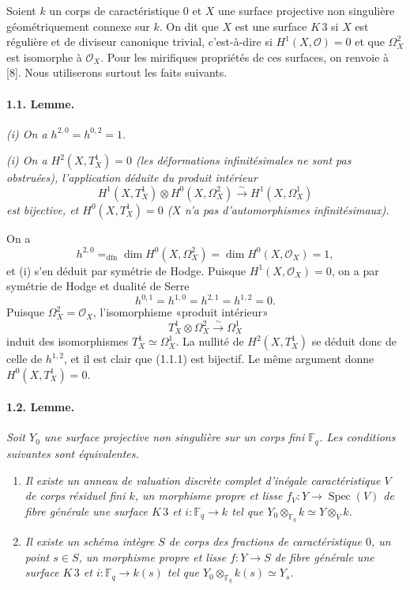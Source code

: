 \documentclass[10pt,leqno]{article}
\newcommand{\Fp}{\mathbb{F}_q}
\newcommand{\Spec}{\operatorname{Spec}}
\newcommand{\dfn}{\mathrm{dfn}}
\newcommand{\iso}{\xrightarrow{\sim}}
\begin{document}
\clearpage

Soient $k$ un corps de caractéristique $0$ et $X$ une surface projective non singulière géométriquement connexe sur $k$. On dit que $X$ est une surface \(K\,3\) si $X$ est régulière et de diviseur canonique trivial, c'est-à-dire si $H^1(X,\mathcal O)=0$ et que $\Omega_X^2$ est isomorphe à $\mathcal O_X$. Pour les mirifiques propriétés de ces surfaces, on renvoie à [8]. Nous utiliserons surtout les faits suivants.

\paragraph{1.1. Lemme.} \emph{(i) On a $h^{2,0}=h^{0,2}=1$.}

\emph{(i) On a $H^2(X,T_X^1)=0$ (les déformations infinitésimales ne sont pas obstruées), l'application déduite du produit intérieur
\[
\tag{1.1.1}
H^1(X,T_X^1)\otimes H^0(X,\Omega_X^2)\iso H^1(X,\Omega_X^1)
\]
est bijective, et $H^0(X,T_X^1)=0$ ($X$ n'a pas d'automorphismes infinitésimaux).}

On a
\[
h^{2,0}=_{\dfn}\dim H^0(X,\Omega_X^2)=\dim H^0(X,\mathcal O_X)=1,
\]
et (i) s'en déduit par symétrie de Hodge. Puisque $H^1(X,\mathcal O_X)=0$, on a par symétrie de Hodge et dualité de Serre
\[
h^{0,1}=h^{1,0}=h^{2,1}=h^{1,2}=0.
\]
Puisque $\Omega_X^2=\mathcal O_X$, l'isomorphisme «produit intérieur»
\[
T_X^1\otimes\Omega_X^2\iso\Omega_X^1
\]
induit des isomorphismes $T_X^1\simeq\Omega_X^1$. La nullité de $H^2(X,T_X^1)$ se déduit donc de celle de $h^{1,2}$, et il est clair que (1.1.1) est bijectif. Le même argument donne $H^0(X,T_X^1)=0$.

\paragraph{1.2. Lemme.} \emph{Soit $Y_0$ une surface projective non singulière sur un corps fini $\Fp$. Les conditions suivantes sont équivalentes.}
\begin{enumerate}[label=(\roman*)]
\item \emph{Il existe un anneau de valuation discrète complet d'inégale caractéristique $V$ de corps résiduel fini $k$, un morphisme propre et lisse $f_V:Y\to\Spec(V)$ de fibre générale une surface \(K\,3\) et $i:\Fp\to k$ tel que $Y_0\otimes_{\Fp}k\simeq Y\otimes_V k$.}
\item \emph{Il existe un schéma intègre $S$ de corps des fractions de caractéristique $0$, un point $s\in S$, un morphisme propre et lisse $f:Y\to S$ de fibre générale une surface \(K\,3\) et $i:\Fp\to k(s)$ tel que $Y_0\otimes_{\Fp}k(s)\simeq Y_s$.}
\end{enumerate}
\end{document}
